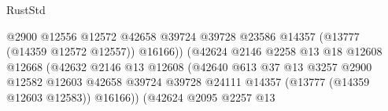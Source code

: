 \begin{lexlean}{RustStd}
\begin{coremodule}
                                                          @2900
                                                          @12556
                                                          @12572
                                                          @42658
                                                          @39724
                                                          @39728
                                                          @23586
                                                          @14357
                                                          (@13777 (@14359 @12572 @12557))
                                                          @16166))
                                                      (@42624
                                                        @2146
                                                        @2258
                                                        @13
                                                        @18
                                                        @12608
                                                        @12668
                                                        (@42632
                                                          @2146
                                                          @13
                                                          @12608
                                                          (@42640
                                                            @613
                                                            @37
                                                            @13
                                                            @3257
                                                            @2900
                                                            @12582
                                                            @12603
                                                            @42658
                                                            @39724
                                                            @39728
                                                            @24111
                                                            @14357
                                                            (@13777 (@14359 @12603 @12583))
                                                            @16166))
                                                        (@42624
                                                          @2095
                                                          @2257
                                                          @13

\end{coremodule}
\end{lexlean}
